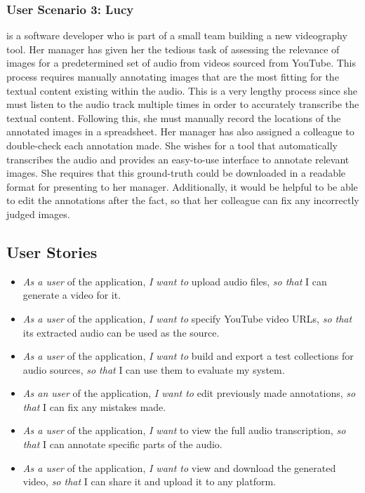 \documentclass{l4proj}
\begin{document}
\subsubsection{User Scenario 3: Lucy} is a software developer who is part of a small team building a new videography tool. Her manager has given her the tedious task of assessing the relevance of images for a predetermined set of audio from videos sourced from YouTube. This process requires manually annotating images that are the most fitting for the textual content existing within the audio. This is a very lengthy process since she must listen to the audio track multiple times in order to accurately transcribe the textual content. Following this, she must manually record the locations of the annotated images in a spreadsheet. Her manager has also assigned a colleague to double-check each annotation made. She wishes for a tool that automatically transcribes the audio and provides an easy-to-use interface to annotate relevant images. She requires that this ground-truth could be downloaded in a readable format for presenting to her manager. Additionally, it would be helpful to be able to edit the annotations after the fact, so that her colleague can fix any incorrectly judged images.


\subsection{User Stories}
\begin{itemize}
    \item \emph{As a user} of the application, \emph{I want to} upload audio files, \emph{so that} I can generate a video for it.
    \item \emph{As a user} of the application, \emph{I want to} specify YouTube video URLs, \emph{so that} its extracted audio can be used as the source.
    \item \emph{As a user} of the application, \emph{I want to} build and export a test collections for audio sources, \emph{so that} I can use them to evaluate my system.
    \item \emph{As an user} of the application, \emph{I want to} edit previously made annotations, \emph{so that} I can fix any mistakes made.
    \item \emph{As a user} of the application, \emph{I want} to view the full audio transcription, \emph{so that} I can annotate specific parts of the audio.
    \item \emph{As a user} of the application, \emph{I want to} view and download the generated video, \emph{so that} I can share it and upload it to any platform.
\end{itemize}
\end{document}
